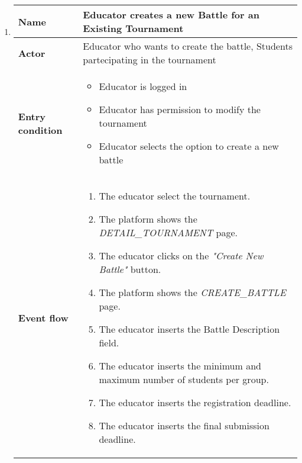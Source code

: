 \begin{enumerate}[label=\textbf{UC\arabic*}:,leftmargin=1.3cm]
            \item \textbf{}
            \begin{table}[H]
                  \centering
                  \begin{tabular}{|l|p{11.9cm}|}
                        \hline
                        \textbf{Name}            & Educator creates a new Battle for an Existing Tournament                                                              \\\hline
                        \textbf{Actor}           & Educator who wants to create the battle, Students partecipating in the tournament                                            \\\hline
                        \textbf{Entry condition} &
                        \begin{itemize}
                              \item Educator is logged in
                              \item Educator has permission to modify the tournament
                              \item Educator selects the option to create a new battle
                        \end{itemize}                                                                  \\\hline
                        \textbf{Event flow}      &
                        \begin{enumerate}[label=\arabic*.]
                              \item The educator select the tournament.
                              \item The platform shows the \emph{DETAIL\_TOURNAMENT} page.
                              \item The educator clicks on the \emph{"Create New Battle"} button.
                              \item The platform shows the \emph{CREATE\_BATTLE} page.
                              \item The educator inserts the Battle Description field.
                              \item The educator inserts the minimum and maximum number of students per group.
                              \item The educator inserts the registration deadline.
                              \item The educator inserts the final submission deadline.

\end{enumerate}
\end{tabular}
\end{table}
\end{enumerate}
